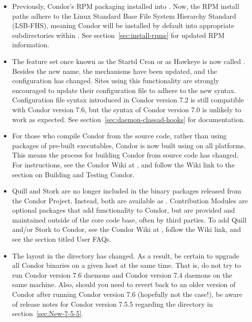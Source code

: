\begin{itemize}

\item  Previously, Condor's RPM packaging installed into .
  Now, the RPM install paths adhere to the Linux Standard Base File System
  Hierarchy Standard (LSB-FHS), meaning Condor will be installed by default
  into appropriate subdirectories within .  
  See section~\ref{sec:install-rpms} for updated RPM information. 

\item  The feature set once known as the Startd Cron or as Hawkeye is now
  called .  Besides the new name, the mechanisms
  have been updated, and the configuration has changed.
  Sites using this functionality are strongly encouraged to
  update their configuration file to adhere to the new syntax. 
  Configuration file syntax introduced in Condor version 7.2 
  is still compatible with Condor version 7.6,
  but the syntax of Condor version 7.0 is unlikely to work as expected.
  See section~\ref{sec:daemon-classad-hooks} for documentation.

\item  For those who compile Condor from the source code, 
  rather than using packages of pre-built executables, 
  Condor is now built using  on all platforms.
  This means the process for building Condor from source code has changed.
  For instructions, 
  see the Condor Wiki at , and follow 
  the Wiki link to the section on Building and Testing Condor.

\item  Quill and Stork are no longer included in the binary packages
  released from the Condor Project. Instead, both are available as
  . 
  Contribution Modules are optional packages that add functionality to Condor,
  but are provided and maintained outside of the core code base, 
  often by third parties. 
  To add Quill and/or Stork to Condor, 
  see the Condor Wiki at , follow 
  the Wiki link, and see the section titled User FAQs.

\item The layout in the  directory has changed.
  As a result,
  be certain to upgrade all Condor binaries on a given host at the same time.
  That is, do not try to run Condor version 7.6  daemons 
  and Condor version 7.4  daemons on the same machine.
  Also, should you need to revert back to an older version of
  Condor after running Condor version 7.6 (hopefully not the case!),
  be aware of release notes for Condor version 7.5.5 regarding the 
   directory in section~\ref{sec:New-7-5-5}.


\end{itemize}
